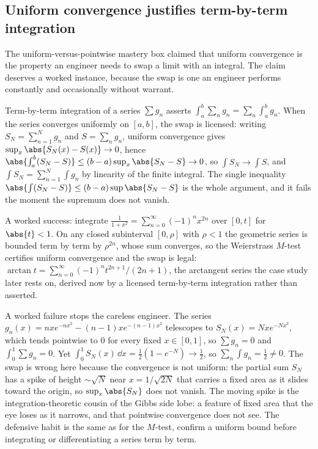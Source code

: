 \subsection{Uniform convergence justifies term-by-term integration}

The uniform-versus-pointwise mastery box claimed that uniform
convergence is the property an engineer needs to swap a limit with an
integral. The claim deserves a worked instance, because the swap is one
an engineer performs constantly and occasionally without warrant.

Term-by-term integration of a series $\sum g_{n}$ asserts
$\int_{a}^{b}\sum_{n} g_{n} = \sum_{n}\int_{a}^{b} g_{n}$. When the
series converges uniformly on $[a, b]$, the swap is licensed: writing
$S_{N} = \sum_{n=1}^{N} g_{n}$ and $S = \sum_{n} g_{n}$, uniform
convergence gives $\sup_{x}\abs{S_{N}(x) - S(x)} \to 0$, hence
$\abs{\int_{a}^{b}(S_{N} - S)} \leq (b - a)\sup_{x}\abs{S_{N} - S} \to
0$, so $\int S_{N} \to \int S$, and $\int S_{N} = \sum_{n=1}^{N}\int
g_{n}$ by linearity of the finite integral. The single inequality
$\abs{\int (S_{N} - S)} \leq (b-a)\sup\abs{S_{N} - S}$ is the whole
argument, and it fails the moment the supremum does not vanish.

A worked success: integrate $\frac{1}{1 + x^{2}} = \sum_{n=0}^{\infty}
(-1)^{n} x^{2n}$ over $[0, t]$ for $\abs{t} < 1$. On any closed
subinterval $[0, \rho]$ with $\rho < 1$ the geometric series is bounded
term by term by $\rho^{2n}$, whose sum converges, so the Weierstrass
$M$-test certifies uniform convergence and the swap is legal:
$\arctan t = \sum_{n=0}^{\infty}(-1)^{n} t^{2n+1}/(2n+1)$, the
arctangent series the case study later rests on, derived now by a
licensed term-by-term integration rather than asserted.

A worked failure stops the careless engineer. The series $g_{n}(x) =
n x e^{-n x^{2}} - (n-1) x e^{-(n-1)x^{2}}$ telescopes to $S_{N}(x) =
N x e^{-N x^{2}}$, which tends pointwise to $0$ for every fixed $x \in
[0, 1]$, so $\sum g_{n} = 0$ and $\int_{0}^{1}\sum g_{n} = 0$. Yet
$\int_{0}^{1} S_{N}(x)\,\dd x = \tfrac{1}{2}(1 - e^{-N}) \to \tfrac{1}{2}$,
so $\sum_{n}\int g_{n} = \tfrac{1}{2} \neq 0$. The swap is wrong here
because the convergence is not uniform: the partial sum $S_{N}$ has a
spike of height $\sim\sqrt{N}$ near $x = 1/\sqrt{2N}$ that carries a
fixed area as it slides toward the origin, so $\sup_{x}\abs{S_{N}}$ does
not vanish. The moving spike is the integration-theoretic cousin of the
Gibbs side lobe: a feature of fixed area that the eye loses as it
narrows, and that pointwise convergence does not see. The defensive
habit is the same as for the $M$-test, confirm a uniform bound before
integrating or differentiating a series term by term.

